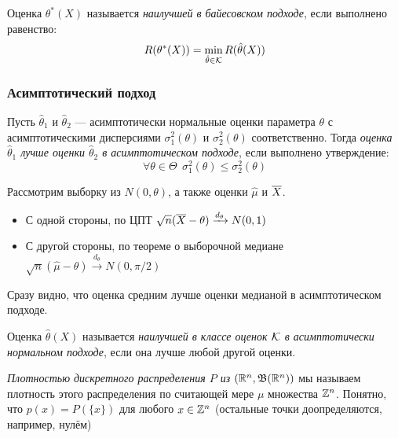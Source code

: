 \begin{definition}
	Оценка $\theta^*(X)$ называется \textit{наилучшей в байесовском подходе}, если выполнено равенство:
	\[
		R(\theta^*(X)) = \min_{\hat{\theta} \in \mathcal{K}} R(\hat{\theta}(X))
	\]
\end{definition}

\subsubsection{Асимптотический подход}

\begin{definition}
	Пусть $\hat{\theta}_1$ и $\hat{\theta}_2$ --- асимптотически нормальные оценки параметра $\theta$ с асимптотическими дисперсиями $\sigma_1^2(\theta)$ и $\sigma_2^2(\theta)$ соответственно. Тогда \textit{оценка $\hat{\theta}_1$ лучше оценки $\hat{\theta}_2$ в асимптотическом подходе}, если выполнено утверждение:
	\[
		\forall \theta \in \Theta\ \ \sigma_1^2(\theta) \le \sigma_2^2(\theta)
	\]
\end{definition}

\begin{example}
	Рассмотрим выборку из $N(0, \theta)$, а также оценки $\hat{\mu}$ и $\overline{X}$.
	\begin{itemize}
		\item С одной стороны, по ЦПТ $\sqrt{n}(\overline{X} - \theta) \xrightarrow{d_\theta} N(0, 1)$
		
		\item С другой стороны, по теореме о выборочной медиане $\sqrt{n}(\hat{\mu} - \theta) \xrightarrow{d_{\theta}} N(0, \pi / 2)$
	\end{itemize}
	Сразу видно, что оценка средним лучше оценки медианой в асимптотическом подходе.
\end{example}

\begin{definition}
	Оценка $\hat{\theta}(X)$ называется \textit{наилучшей в классе оценок $\mathcal{K}$ в асимптотически нормальном подходе}, если она лучше любой другой оценки.
\end{definition}

\begin{note}
	\textit{Плотностью дискретного распределения $P$ из $(\mathbb{R}^n, \mathfrak{B}(\mathbb{R}^n))$} мы называем плотность этого распределения по считающей мере $\mu$ множества $\mathbb{Z}^n$. Понятно, что $p(x) = P(\{x\})$ для любого $x \in \mathbb{Z}^n$ (остальные точки доопределяются, например, нулём)
\end{note}

